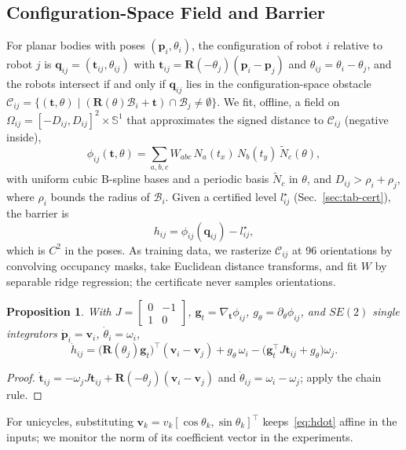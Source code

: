 \documentclass[journal]{IEEEtran}
\newtheorem{proposition}{Proposition}
\theoremstyle{definition}
\newcommand{\Sone}{\mathbb{S}^1}
\newcommand{\CO}{\mathcal{C}}
\newcommand{\Rot}{\mathbf{R}}
\begin{document}
\subsection{Configuration-Space Field and Barrier}
For planar bodies with poses $(\mathbf p_i,\theta_i)$, the configuration of robot $i$ relative to
robot $j$ is $\mathbf q_{ij}=(\mathbf t_{ij},\theta_{ij})$ with
$\mathbf t_{ij}=\Rot(-\theta_j)(\mathbf p_i-\mathbf p_j)$ and $\theta_{ij}=\theta_i-\theta_j$, and
the robots intersect if and only if $\mathbf q_{ij}$ lies in the configuration-space obstacle
$\CO_{ij}=\{(\mathbf t,\theta)\mid(\Rot(\theta)\mathcal B_i+\mathbf t)\cap\mathcal B_j\neq\emptyset\}$.
We fit, offline, a field on $\Omega_{ij}=[-D_{ij},D_{ij}]^2\times\Sone$ that approximates the signed
distance to $\CO_{ij}$ (negative inside),
\begin{equation}\label{eq:field}
\phi_{ij}(\mathbf t,\theta)=\textstyle\sum_{a,b,c}W_{abc}\,N_a(t_x)\,N_b(t_y)\,\tilde N_c(\theta),
\end{equation}
with uniform cubic B-spline bases and a periodic basis $\tilde N_c$ in $\theta$, and
$D_{ij}>\rho_i+\rho_j$, where $\rho_i$ bounds the radius of $\mathcal B_i$. Given a certified level
$l^\star_{ij}$ (Sec.~\ref{sec:tab-cert}), the barrier is
\begin{equation}\label{eq:h}
h_{ij}=\phi_{ij}(\mathbf q_{ij})-l^\star_{ij},
\end{equation}
which is $C^2$ in the poses. As training data, we rasterize $\CO_{ij}$ at 96 orientations by
convolving occupancy masks, take Euclidean distance transforms, and fit $W$ by separable ridge
regression; the certificate never samples orientations.

\begin{proposition}\label{prop:hdot}
With $J=\left[\begin{smallmatrix}0&-1\\1&0\end{smallmatrix}\right]$,
$\mathbf g_t=\nabla_{\mathbf t}\phi_{ij}$, $g_\theta=\partial_\theta\phi_{ij}$, and
$SE(2)$ single integrators $\dot{\mathbf p}_i=\mathbf v_i$, $\dot\theta_i=\omega_i$,
\begin{equation}\label{eq:hdot}
\dot h_{ij}=\big(\Rot(\theta_j)\mathbf g_t\big)^{\!\top}(\mathbf v_i-\mathbf v_j)
+g_\theta\,\omega_i-\big(\mathbf g_t^{\top}J\mathbf t_{ij}+g_\theta\big)\omega_j .
\end{equation}
\end{proposition}
\begin{proof}
$\dot{\mathbf t}_{ij}=-\omega_jJ\mathbf t_{ij}+\Rot(-\theta_j)(\mathbf v_i-\mathbf v_j)$ and
$\dot\theta_{ij}=\omega_i-\omega_j$; apply the chain rule.
\end{proof}
For unicycles, substituting $\mathbf v_k=v_k[\cos\theta_k,\sin\theta_k]^\top$ keeps~\eqref{eq:hdot} affine
in the inputs; we monitor the norm of its coefficient vector in the experiments.
\end{document}
